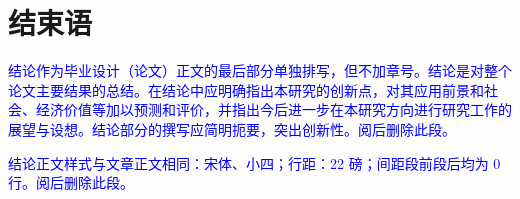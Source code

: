 \chapter*{\vskip 10bp\textmd{结束语} \vskip -6bp}




\textcolor{blue}{结论作为毕业设计（论文）正文的最后部分单独排写，但不加章号。结论是对整个论文主要结果的总结。在结论中应明确指出本研究的创新点，对其应用前景和社会、经济价值等加以预测和评价，并指出今后进一步在本研究方向进行研究工作的展望与设想。结论部分的撰写应简明扼要，突出创新性。阅后删除此段。}

\textcolor{blue}{结论正文样式与文章正文相同：宋体、小四；行距：22 磅；间距段前段后均为 0 行。阅后删除此段。}
